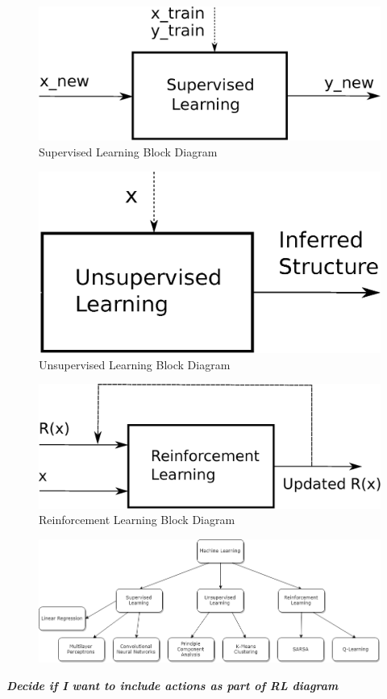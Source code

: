 \documentclass[11pt]{report}
\begin{document}
	\begin{figure}[ht]
		\centering
		\includegraphics[scale=0.4]{figures/supervisedLearningBlock.eps}
		\caption{Supervised Learning Block Diagram}
	\end{figure}
	\begin{figure}[ht]
		\centering
		\includegraphics[scale=0.4]{figures/unsupervisedLearningBlock.eps}
		\caption{Unsupervised Learning Block Diagram}
	\end{figure}
	\begin{figure}[ht]
	\centering
	\includegraphics[scale=0.4]{figures/reinforcementLearningBlock.eps}
	\caption{Reinforcement Learning Block Diagram}
	\end{figure}
	\begin{figure}[ht]
		\centering
		\includegraphics[scale=0.5]{figures/MLdiagram.png}
	\end{figure}
	\par \textbf{\textit{Decide if I want to include actions as part of RL diagram}}
	
\end{document}
